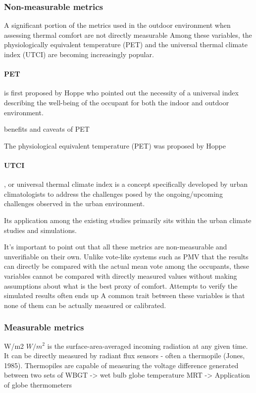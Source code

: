 \subsubsection{Non-measurable metrics}
    A significant portion of the metrics used in the outdoor environment when assessing thermal comfort are not directly measurable
    Among these variables, the physiologically equivalent temperature (PET) and the universal thermal climate index (UTCI) are becoming increasingly popular.
    \paragraph{PET} is first proposed by Hoppe who pointed out the necessity of a universal index describing the well-being of the occupant for both the indoor and outdoor environment. 
    
    benefits and caveats of PET
    

    The physiological equivalent temperature (PET) was proposed by Hoppe\cite{h._hoppe_new_1992}   
    \paragraph{UTCI}, or universal thermal climate index is a concept specifically developed by urban climatologists to address the challenges posed by the ongoing/upcoming challenges observed in the urban environment.
    
    Its application among the existing studies primarily sits within the urban climate studies and simulations.
    
    It's important to point out that all these metrics are non-measurable and unverifiable on their own. Unlike vote-like systems such as PMV that the results can directly be compared with the actual mean vote among the occupants, these variables cannot be compared with directly measured values without making assumptions about what is the best proxy of comfort. 
    Attempts to verify the simulated results often ends up  
    A common trait between these variables is that none of them can be actually measured or calibrated. 
\subsubsection{Measurable metrics}
        W/m2
        $W/m^2$ is the surface-area-averaged incoming radiation at any given time. It can be directly measured by radiant flux sensors - often a thermopile (Jones, 1985). Thermopiles are capable of measuring the voltage difference generated between two sets of 
        WBGT -> wet bulb globe temperature
        MRT -> Application of globe thermometers
